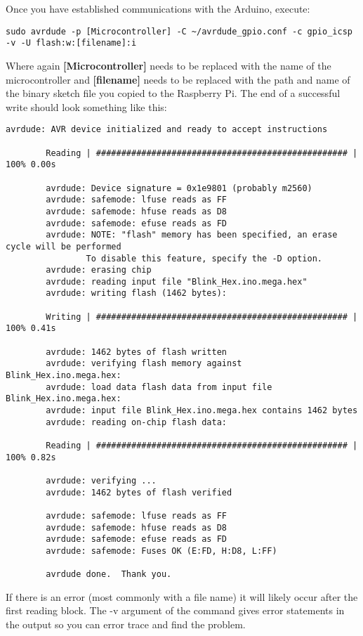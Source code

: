     Once you have established communications with the Arduino, execute:

    \begin{lstlisting}[style=kaolstplain,linewidth=1.5\textwidth]
        sudo avrdude -p [Microcontroller] -C ~/avrdude_gpio.conf -c gpio_icsp -v -U flash:w:[filename]:i
    \end{lstlisting}

    Where again \textbf{[Microcontroller]} needs to be replaced with the name of the microcontroller and \textbf{[filename]} needs to be replaced with the path and name of the binary sketch file you copied to the Raspberry Pi.
    The end of a successful write should look something like this:

    \begin{lstlisting}[style=kaolstplain,linewidth=1.5\textwidth]
        avrdude: AVR device initialized and ready to accept instructions

        Reading | ################################################## | 100% 0.00s

        avrdude: Device signature = 0x1e9801 (probably m2560)
        avrdude: safemode: lfuse reads as FF
        avrdude: safemode: hfuse reads as D8
        avrdude: safemode: efuse reads as FD
        avrdude: NOTE: "flash" memory has been specified, an erase cycle will be performed
                To disable this feature, specify the -D option.
        avrdude: erasing chip
        avrdude: reading input file "Blink_Hex.ino.mega.hex"
        avrdude: writing flash (1462 bytes):

        Writing | ################################################## | 100% 0.41s

        avrdude: 1462 bytes of flash written
        avrdude: verifying flash memory against Blink_Hex.ino.mega.hex:
        avrdude: load data flash data from input file Blink_Hex.ino.mega.hex:
        avrdude: input file Blink_Hex.ino.mega.hex contains 1462 bytes
        avrdude: reading on-chip flash data:

        Reading | ################################################## | 100% 0.82s

        avrdude: verifying ...
        avrdude: 1462 bytes of flash verified

        avrdude: safemode: lfuse reads as FF
        avrdude: safemode: hfuse reads as D8
        avrdude: safemode: efuse reads as FD
        avrdude: safemode: Fuses OK (E:FD, H:D8, L:FF)

        avrdude done.  Thank you.
    \end{lstlisting}

    If there is an error (most commonly with a file name) it will likely occur after the first reading block. 
    The -v argument of the command gives error statements in the output so you can error trace and find the problem. 
